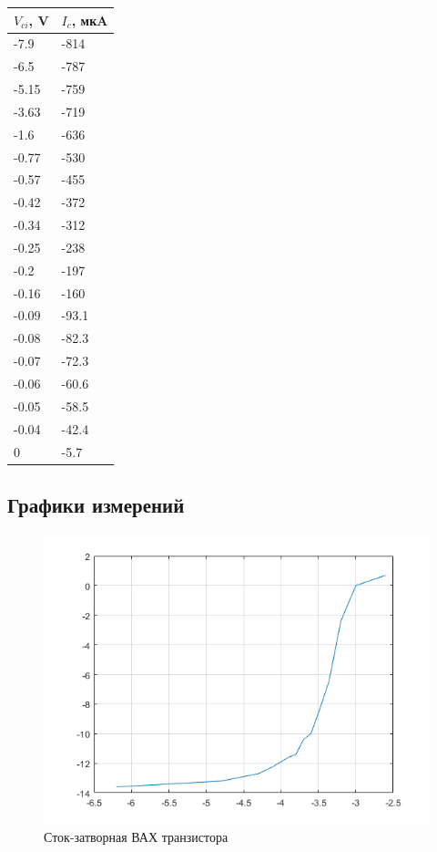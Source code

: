 \documentclass[a4paper,14pt]{article}
\begin{document}
\begin{table}[H]
	\begin{center}
		\begin{tabular}{|l|l|}
			\hline
			$V_{ci}$, V & $I_c$, мкA \\ \hline
			-7.9	&	-814 \\ \hline
			-6.5	&	-787 \\ \hline
			-5.15	&	-759 \\ \hline
			-3.63	&	-719 \\ \hline
			-1.6	&	-636 \\ \hline
			-0.77	&	-530 \\ \hline
			-0.57	&	-455 \\ \hline
			-0.42	&	-372 \\ \hline
			-0.34	&	-312 \\ \hline
			-0.25	&	-238 \\ \hline
			-0.2	&	-197 \\ \hline
			-0.16	&	-160 \\ \hline
			-0.09	&	-93.1 \\ \hline
			-0.08	&	-82.3 \\ \hline
			-0.07	&	-72.3 \\ \hline
			-0.06	&	-60.6 \\ \hline
			-0.05	&	-58.5 \\ \hline
			-0.04	&	-42.4 \\ \hline
			0	&	-5.7 \\ \hline
		\end{tabular}
	\end{center}
\end{table}

\subsection{Графики измерений}

\begin{figure}[H]
	\centering
	\includegraphics[width=0.7\linewidth]{image/graph_1}
	\caption{Сток-затворная ВАХ транзистора}
	\label{fig:graph1}
\end{figure}
\end{document}
